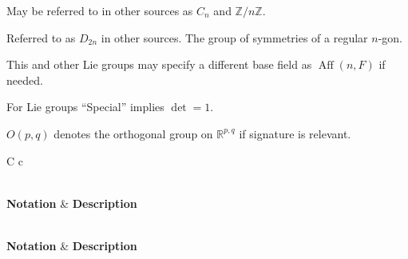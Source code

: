 \begin{ThreePartTable}
\begin{TableNotes}[flushleft]
\footnotesize
\item[\({[\alpha]}\)] May be referred to in other sources as $C_n$ and $\mathbb{Z}/n\mathbb{Z}$.
\item[\({[\beta]}\)] Referred to as \(D_{2n}\) in other sources. The group of symmetries of a regular \(n\)-gon.
\item[\({[\gamma]}\)] This and other Lie groups may specify a different base field as \(\operatorname{Aff}(n, F)\) if needed.
\item[\({[\delta]}\)] For Lie groups “Special” implies \(\det = 1\).
\item[\({[\epsilon]}\)] \(O(p, q)\) denotes the orthogonal group on \(\mathbb{R}^{p, q}\) if signature is relevant.
\end{TableNotes}

\begin{longtable}{C c}
\caption{Standard notation for common sets and groups}\label{tab:notation}\\
\toprule
\textbf{Notation} & \textbf{Description} \\
\midrule
\endfirsthead

\\
\toprule
\textbf{Notation} & \textbf{Description} \\
\midrule
\endhead

\midrule
\endfoot

\bottomrule
\insertTableNotes %
\endlastfoot


\end{longtable}
\end{ThreePartTable}
